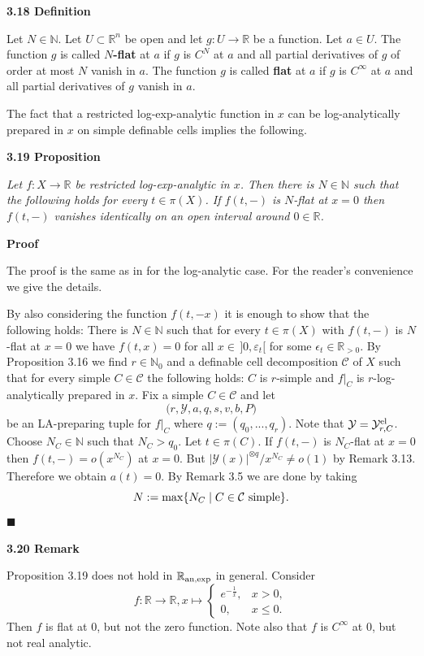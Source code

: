 \documentclass[12pt]{article}
\def\vs{\vspace}
\def\ma{\mathcal}
\begin{document}
\vs{0.5cm}
{\bf3.18 Definition}

\vs{0.1cm}
Let $N \in \mathbb{N}$. Let $U \subset \mathbb{R}^n$ be open and let $g:U \to \mathbb{R}$ be a function. Let $a \in U$. 
The function $g$ is called {\bf $N$-flat} at $a$ if $g$ is $C^N$ at $a$ and all partial derivatives of $g$ of order at most $N$ vanish in $a$. The function $g$ is called {\bf flat} at $a$ if $g$ is $C^\infty$ at $a$ and all partial derivatives of $g$ vanish in $a$.

\vs{0.5cm}
The fact that a restricted log-exp-analytic function in $x$ can be log-analytically prepared in $x$ on simple definable cells implies the following.

\vs{0.5cm}
{\bf3.19 Proposition}

\vs{0.1cm}
{\it Let $f:X \to \mathbb{R}$ be restricted log-exp-analytic in $x$. Then there is $N \in \mathbb{N}$ such that the following holds for every $t \in \pi(X)$. If $f(t,-)$ is $N$-flat at $x=0$ then $f(t,-)$ vanishes identically on an open interval around $0 \in \mathbb{R}$.}

\vs{0.4cm}
{\bf Proof}

\vs{0.2cm}
The proof is the same as in \cite{7} for the log-analytic case. For the reader's convenience we give the details. 

\vs{0.1cm}
By also considering the function $f(t,-x)$ it is enough to show that the following holds:
There is $N \in \mathbb{N}$ such that for every $t \in \pi(X)$ with $f(t,-)$ is $N$-flat at $x=0$ we have $f(t,x)=0$ for all $x \in \, ]0,\varepsilon_t[$ for some $\epsilon_t \in \mathbb{R}_{>0}$. 
By Proposition 3.16 we find $r \in \mathbb{N}_0$ and a definable cell decomposition $\mathcal{C}$ of $X$ such that for every simple $C \in \mathcal{C}$ the following holds: $C$ is $r$-simple and $f|_C$ is $r$-log-analytically prepared in $x$. Fix a simple $C \in \ma{C}$ and let 
$$\big(r,\mathcal{Y},a,q,s,v,b,P \big)$$
be an LA-preparing tuple for $f|_C$ where $q:=(q_0,...,q_r)$. Note that $\mathcal{Y} = \mathcal{Y}_{r,C}^\textnormal{el}$. Choose $N_C \in \mathbb{N}$ such that $N_C > q_0$. Let $t \in \pi(C)$.
If $f(t,-)$ is $N_C$-flat at $x=0$ then $f(t,-)=o(x^{N_C})$ at $x=0$. But $|\mathcal{Y}(x)|^{\otimes q}/x^{N_C} \neq o(1)$ by Remark 3.13. Therefore we obtain $a(t)=0$. By Remark 3.5 we are done by taking 
$$N:=\max\{N_C \mid C \in \ma{C} \textnormal{ simple}\}.$$
\hfill$\blacksquare$

\vs{0.5cm}
{\bf3.20 Remark}

\vs{0.1cm}
Proposition 3.19 does not hold in $\mathbb{R}_{\textnormal{an,exp}}$ in general. Consider
$$f:\mathbb{R} \to \mathbb{R}, x \mapsto \left\{\begin{array}{cc}
e^{-\frac{1}{x}},&x>0,\\
0,& x \leq 0.
\end{array}\right.$$
Then $f$ is flat at $0$, but not the zero function. Note also that $f$ is $C^\infty$ at $0$, but not real analytic.
\end{document}
